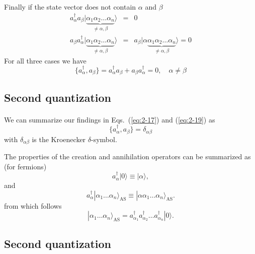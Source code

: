 \documentclass[%
twoside,                 %
final,                   %
10pt]{article}
\begin{document}
\paragraph{}
Finally if the state vector does not contain $\alpha$ and $\beta$
\begin{eqnarray}
	a_\alpha^{\dagger} a_\beta |\underbrace{\alpha_1\alpha_2 \dots \alpha_{n}}_{\neq \alpha,\beta}\rangle &=& 0 \nonumber \\
	a_\beta a_\alpha^{\dagger} |\underbrace{\alpha_1\alpha_2 \dots \alpha_{n}}_{\neq \alpha,\beta}\rangle &=& 
		a_\beta |\alpha \underbrace{\alpha_1\alpha_2 \dots \alpha_{n}}_{\neq \alpha,\beta}\rangle = 0 \label{eq:2-18c}
\end{eqnarray}
For all three cases we have
\begin{equation}
	\{a_\alpha^{\dagger},a_\beta \} = a_\alpha^{\dagger} a_\beta + a_\beta a_\alpha^{\dagger} = 0, \quad \alpha \neq \beta \label{eq:2-19}
\end{equation}




\subsection*{Second quantization}

\paragraph{}
We can summarize  our findings in Eqs.~(\ref{eq:2-17}) and (\ref{eq:2-19}) as 
\begin{equation}
	\{a_\alpha^{\dagger},a_\beta \} = \delta_{\alpha\beta} \label{eq:2-20}
\end{equation}
with  $\delta_{\alpha\beta}$ is the Kroenecker $\delta$-symbol.

The properties of the creation and annihilation operators can be summarized as (for fermions)
\[
	a_\alpha^{\dagger}|0\rangle \equiv  |\alpha\rangle,
\]
and
\[
	a_\alpha^{\dagger}|\alpha_1\dots \alpha_n\rangle_{\mathrm{AS}} \equiv  |\alpha\alpha_1\dots \alpha_n\rangle_{\mathrm{AS}}. 
\]
from which follows
\[
        |\alpha_1\dots \alpha_n\rangle_{\mathrm{AS}} = a_{\alpha_1}^{\dagger} a_{\alpha_2}^{\dagger} \dots a_{\alpha_n}^{\dagger} |0\rangle.
\]




\subsection*{Second quantization}
\end{document}
